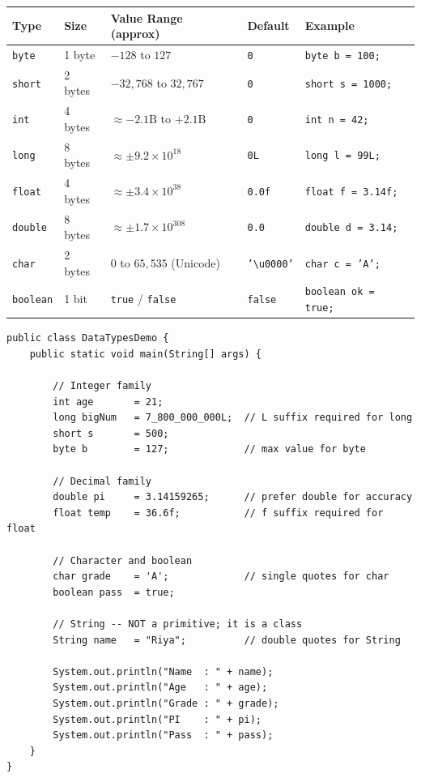 \documentclass[12pt,a4paper,oneside]{book}
\renewcommand{\arraystretch}{1.35}
\begin{document}
\begin{center}
{\setlength{\arrayrulewidth}{0.4pt}%
\renewcommand{\arraystretch}{1.4}%
\begin{tabular}{!{\color{black!30}\vrule}l!{\color{black!30}\vrule}l!{\color{black!30}\vrule}l!{\color{black!30}\vrule}l!{\color{black!30}\vrule}l!{\color{black!30}\vrule}}
\toprule
\textbf{Type} & \textbf{Size} & \textbf{Value Range (approx)} & \textbf{Default} & \textbf{Example}\\
\midrule
\texttt{byte}    & 1 byte  & $-128$ to $127$                          & \texttt{0}     & \texttt{byte b = 100;}\\
\texttt{short}   & 2 bytes & $-32{,}768$ to $32{,}767$                & \texttt{0}     & \texttt{short s = 1000;}\\
\texttt{int}     & 4 bytes & $\approx -2.1\text{B}$ to $+2.1\text{B}$& \texttt{0}     & \texttt{int n = 42;}\\
\texttt{long}    & 8 bytes & $\approx \pm 9.2 \times 10^{18}$         & \texttt{0L}    & \texttt{long l = 99L;}\\
\texttt{float}   & 4 bytes & $\approx \pm 3.4 \times 10^{38}$         & \texttt{0.0f}  & \texttt{float f = 3.14f;}\\
\texttt{double}  & 8 bytes & $\approx \pm 1.7 \times 10^{308}$        & \texttt{0.0}   & \texttt{double d = 3.14;}\\
\texttt{char}    & 2 bytes & $0$ to $65{,}535$ (Unicode)               & \texttt{'\textbackslash{}u0000'} & \texttt{char c = 'A';}\\
\texttt{boolean} & 1 bit   & \texttt{true} / \texttt{false}           & \texttt{false} & \texttt{boolean ok = true;}\\
\bottomrule
\end{tabular}}
\end{center}

\begin{lstlisting}[caption={Variables and Data Types in Action}]
public class DataTypesDemo {
    public static void main(String[] args) {

        // Integer family
        int age       = 21;
        long bigNum   = 7_800_000_000L;  // L suffix required for long
        short s       = 500;
        byte b        = 127;             // max value for byte

        // Decimal family
        double pi     = 3.14159265;      // prefer double for accuracy
        float temp    = 36.6f;           // f suffix required for float

        // Character and boolean
        char grade    = 'A';             // single quotes for char
        boolean pass  = true;

        // String -- NOT a primitive; it is a class
        String name   = "Riya";          // double quotes for String

        System.out.println("Name  : " + name);
        System.out.println("Age   : " + age);
        System.out.println("Grade : " + grade);
        System.out.println("PI    : " + pi);
        System.out.println("Pass  : " + pass);
    }
}
\end{lstlisting}
\end{document}
